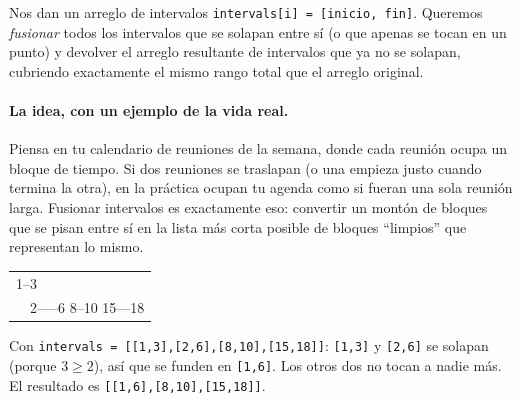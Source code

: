
Nos dan un arreglo de intervalos \texttt{intervals[i] = [inicio, fin]}.
Queremos \emph{fusionar} todos los intervalos que se solapan entre sí (o que
apenas se tocan en un punto) y devolver el arreglo resultante de intervalos
que ya no se solapan, cubriendo exactamente el mismo rango total que el
arreglo original.

\paragraph{La idea, con un ejemplo de la vida real.} Piensa en tu calendario
de reuniones de la semana, donde cada reunión ocupa un bloque de tiempo.
Si dos reuniones se traslapan (o una empieza justo cuando termina la otra),
en la práctica ocupan tu agenda como si fueran una sola reunión larga.
Fusionar intervalos es exactamente eso: convertir un montón de bloques que
se pisan entre sí en la lista más corta posible de bloques ``limpios'' que
representan lo mismo.

\begin{center}
\ttfamily
\begin{tabular}{l}
1--3\\
\ \ 2-----6 \hspace{1cm} 8--10 \hspace{1cm} 15---18\\
\end{tabular}
\end{center}

\noindent Con \texttt{intervals = [[1,3],[2,6],[8,10],[15,18]]}: \texttt{[1,3]}
y \texttt{[2,6]} se solapan (porque $3 \geq 2$), así que se funden en
\texttt{[1,6]}. Los otros dos no tocan a nadie más. El resultado es
\texttt{[[1,6],[8,10],[15,18]]}.

